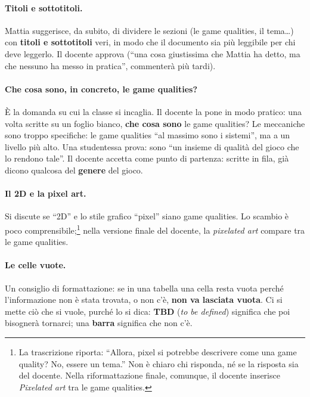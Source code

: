 \paragraph{Titoli e sottotitoli.} Mattia suggerisce, da subito, di dividere
le sezioni (le game qualities, il tema\ldots) con \textbf{titoli e
sottotitoli} veri, in modo che il documento sia più leggibile per chi deve
leggerlo. Il docente approva (``una cosa giustissima che Mattia ha detto, ma
che nessuno ha messo in pratica'', commenterà più tardi).

\paragraph{Che cosa sono, in concreto, le game qualities?} È la domanda su
cui la classe si incaglia. Il docente la pone in modo pratico: una volta
scritte su un foglio bianco, \textbf{che cosa sono} le game qualities? Le
meccaniche sono troppo specifiche: le game qualities ``al massimo sono i
sistemi'', ma a un livello più alto. Una studentessa prova: sono ``un insieme
di qualità del gioco che lo rendono tale''. Il docente accetta come punto di
partenza: scritte in fila, già dicono qualcosa del \textbf{genere} del gioco.

\paragraph{Il 2D e la pixel art.} Si discute se ``2D'' e lo stile grafico
``pixel'' siano game qualities. Lo scambio è poco comprensibile;\footnote{La
trascrizione riporta: ``Allora, pixel si potrebbe descrivere come una game
quality? No, essere un tema.'' Non è chiaro chi risponda, né se la risposta
sia del docente. Nella riformattazione finale, comunque, il docente inserisce
\emph{Pixelated art} tra le game qualities.} nella versione finale del
docente, la \emph{pixelated art} compare tra le game qualities.

\paragraph{Le celle vuote.} Un consiglio di formattazione: se in una tabella
una cella resta vuota perché l'informazione non è stata trovata, o non c'è,
\textbf{non va lasciata vuota}. Ci si mette ciò che si vuole, purché lo si
dica: \textbf{TBD} (\emph{to be defined}) significa che poi bisognerà
tornarci; una \textbf{barra} significa che non c'è.

